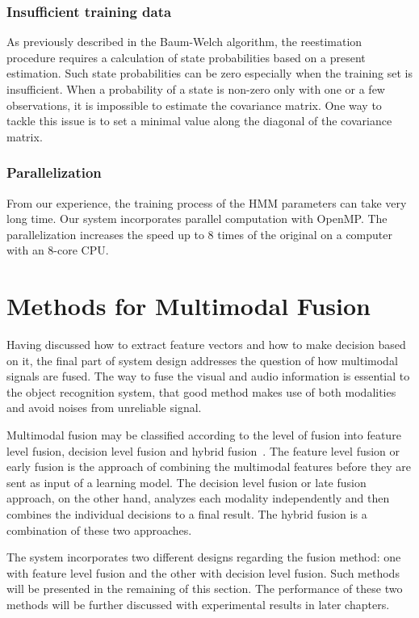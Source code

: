 \documentclass[12pt,final,twoside]{report}
\begin{document}
\subsubsection{Insufficient training data}

As previously described in the Baum-Welch algorithm, the reestimation procedure requires a calculation of state probabilities based on a present estimation. Such state probabilities can be zero especially when the training set is insufficient. When a probability of a state is non-zero only with one or a few observations, it is impossible to estimate the covariance matrix. One way to tackle this issue is to set a minimal value along the diagonal of the covariance matrix. 

\subsubsection{Parallelization}

From our experience, the training process of the HMM parameters can take very long time. Our system incorporates parallel computation with OpenMP. The parallelization increases the speed up to 8 times of the original on a computer with an 8-core CPU.

\section{Methods for Multimodal Fusion}
Having discussed how to extract feature vectors and how to make decision based on it, the final part of system design addresses the question of how multimodal signals are fused. The way to fuse the visual and audio information is essential to the object recognition system, that good method makes use of both modalities and avoid noises from unreliable signal.

Multimodal fusion may be classified according to the level of fusion into feature level fusion, decision level fusion and hybrid fusion~\cite{atrey_multimodal_2010}. The feature level fusion or early fusion is the approach of combining the multimodal features before they are sent as input of a learning model. The decision level fusion or late fusion approach, on the other hand, analyzes each modality independently and then combines the individual decisions to a final result. The hybrid fusion is a combination of these two approaches.

The system incorporates two different designs regarding the fusion method: one with feature level fusion and the other with decision level fusion. Such methods will be presented in the remaining of this section. The performance of these two methods will be further discussed with experimental results in later chapters.
\end{document}
